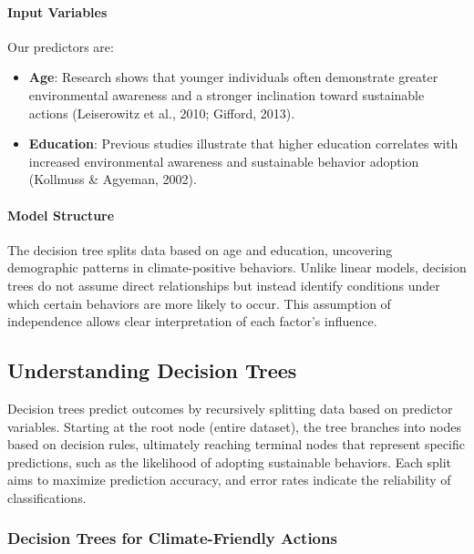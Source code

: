 \documentclass[
  letterpaper,
  DIV=11,
  numbers=noendperiod]{scrartcl}
\let\oldparagraph\paragraph
\renewcommand{\paragraph}[1]{\oldparagraph{#1}\mbox{}}
\begin{document}
\paragraph{Input Variables}\label{input-variables}

Our predictors are:

\begin{itemize}
\item
  \textbf{Age}: Research shows that younger individuals often
  demonstrate greater environmental awareness and a stronger inclination
  toward sustainable actions (Leiserowitz et al., 2010; Gifford, 2013).
\item
  \textbf{Education}: Previous studies illustrate that higher education
  correlates with increased environmental awareness and sustainable
  behavior adoption (Kollmuss \& Agyeman, 2002).
\end{itemize}

\paragraph{Model Structure}\label{model-structure}

The decision tree splits data based on age and education, uncovering
demographic patterns in climate-positive behaviors. Unlike linear
models, decision trees do not assume direct relationships but instead
identify conditions under which certain behaviors are more likely to
occur. This assumption of independence allows clear interpretation of
each factor's influence.

\subsection{Understanding Decision
Trees}\label{understanding-decision-trees}

Decision trees predict outcomes by recursively splitting data based on
predictor variables. Starting at the root node (entire dataset), the
tree branches into nodes based on decision rules, ultimately reaching
terminal nodes that represent specific predictions, such as the
likelihood of adopting sustainable behaviors. Each split aims to
maximize prediction accuracy, and error rates indicate the reliability
of classifications.

\subsubsection{Decision Trees for Climate-Friendly
Actions}\label{decision-trees-for-climate-friendly-actions}
\end{document}
